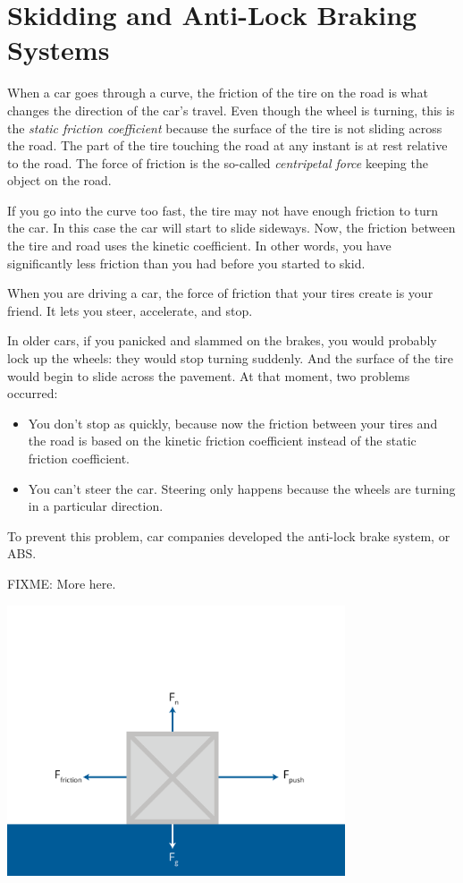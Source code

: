 \section{Skidding and Anti-Lock Braking Systems}

When a car goes through a curve, the friction of the tire on the road is what changes the direction of the 
car's travel. Even though the wheel is turning, this is the \emph{static friction coefficient} because the surface of the tire is not sliding across the road. The part of the tire touching the road at any instant is at rest relative to the road. The force of friction is the so-called \emph{centripetal force} keeping the object on the road.

If you go into the curve too fast, the tire may not have enough friction to turn the car. In this case the car will start to slide sideways. Now, the friction between the tire and road uses the kinetic coefficient. In other words, you have significantly less friction than you had before you started to skid.

When you are driving a car, the force of friction that your tires create is your friend. It lets you steer, accelerate, and stop.

In older cars, if you panicked and slammed on the brakes, you would probably lock up the wheels: they would stop turning suddenly. And the surface of the tire would begin to slide across the pavement. At that moment, two problems occurred:
\begin{itemize}
\item You don't stop as quickly, because now the friction between your tires and the road is based on the kinetic friction coefficient instead of the static friction coefficient.
\item You can't steer the car. Steering only happens because the wheels are turning in a particular direction.
\end{itemize}

To prevent this problem, car companies developed the anti-lock brake system, or ABS.

FIXME: More here.

\includegraphics[width=0.75\textwidth]{friction-01.png}

